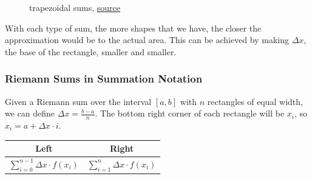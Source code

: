 \documentclass[12pt]{article}
\begin{document}
\begin{itemize}
\begin{figure}[H]
\begin{center}
                            \caption{trapezoidal sums, \href{https://www.khanacademy.org/math/ap-calculus-bc/bc-integration-new/bc-6-2/a/riemann-sums-review?modal=1}{source}}
                        \end{center}
                    \end{figure}
                \end{itemize}
                With each type of sum, the more shapes that we have, the closer the approximation would be to the actual area. This can be achieved by making $\Delta x$, the base of the rectangle, smaller and smaller.

            \subsubsection{Riemann Sums in Summation Notation}
                Given a Riemann sum over the interval $[a, b]$ with $n$ rectangles of equal width, we can define $\Delta x = \frac{b-a}{n}$. The bottom right corner of each rectangle will be $x_i$, so $x_i = a + \Delta x \cdot i$.
                \begin{center}
                    \begin{tabular}{|c|c|}
                        \hline
                        Left & Right \\
                        \hline \hline
                        $\displaystyle \sum_{i=0}^{n-1} \Delta x \cdot f(x_i)$ & $\displaystyle \sum_{i=1}^{n} \Delta x \cdot f(x_i)$ \\
                        \hline
                    \end{tabular}
                \end{center}
\end{document}
